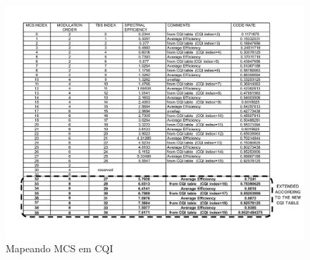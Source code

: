 \documentclass[12pt]{article}
\begin{document}
\begin{figure}[h]
    \centering
    \includegraphics[width=1.2\textwidth]{US10136451-D00000.png}
    \caption{Mapeando MCS em CQI}
    \label{fig:my_label}
\end{figure}
\FloatBarrier
\end{document}
